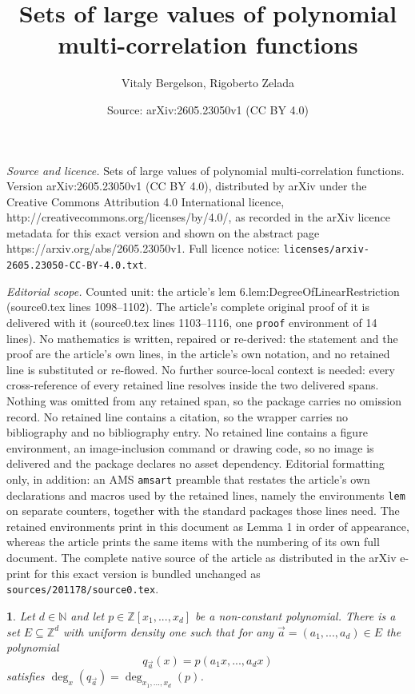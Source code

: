 \documentclass[10pt,a4paper]{amsart}
\title{Sets of large values of polynomial multi-correlation functions}
\author{Vitaly Bergelson, Rigoberto Zelada}
\date{Source: arXiv:2605.23050v1 (CC BY 4.0)}
\newtheorem{lem}{}
\newcommand{\N}{\mathbb{N}}
\newcommand{\Z}{\mathbb{Z}}
\begin{document}
\maketitle

\noindent\emph{Source and licence.} Sets of large values of polynomial multi-correlation functions. Version arXiv:2605.23050v1 (CC BY 4.0), distributed by arXiv under the Creative Commons Attribution 4.0 International licence, http://creativecommons.org/licenses/by/4.0/, as recorded in the arXiv licence metadata for this exact version and shown on the abstract page https://arxiv.org/abs/2605.23050v1. Full licence notice: \texttt{licenses/arxiv-2605.23050-CC-BY-4.0.txt}.\par\smallskip

\noindent\textit{Editorial scope.} Counted unit: the article's lem 6.lem:DegreeOfLinearRestriction (source0.tex lines 1098--1102). The article's complete original proof of it is delivered with it (source0.tex lines 1103--1116, one \texttt{proof} environment of 14 lines). No mathematics is written, repaired or re-derived: the statement and the proof are the article's own lines, in the article's own notation, and no retained line is substituted or re-flowed.  No further source-local context is needed: every cross-reference of every retained line resolves inside the two delivered spans.  Nothing was omitted from any retained span, so the package carries no omission record.  No retained line contains a citation, so the wrapper carries no bibliography and no bibliography entry.  No retained line contains a figure environment, an image-inclusion command or drawing code, so no image is delivered and the package declares no asset dependency.  Editorial formatting only, in addition: an AMS \texttt{amsart} preamble that restates the article's own declarations and macros used by the retained lines, namely the environments \texttt{lem} on separate counters, together with the standard packages those lines need.  The retained environments print in this document as Lemma 1 in order of appearance, whereas the article prints the same items with the numbering of its own full document.  The complete native source of the article as distributed in the arXiv e-print for this exact version is bundled unchanged as \texttt{sources/201178/source0.tex}.
\begin{lem}\label{6.lem:DegreeOfLinearRestriction}
    Let $d\in\N$ and let $p\in \Z[x_1,...,x_d]$ be a non-constant polynomial. There is a set $E\subseteq \Z^d$ with uniform density one such that for any $\vec a=(a_1,...,a_d)\in E$ the polynomial 
    $$q_{\vec a}(x)=p(a_1x,...,a_dx)$$
    satisfies $\deg_x(q_{\vec a})=\deg_{x_1,...,x_d}(p)$.
\end{lem}
\end{document}
